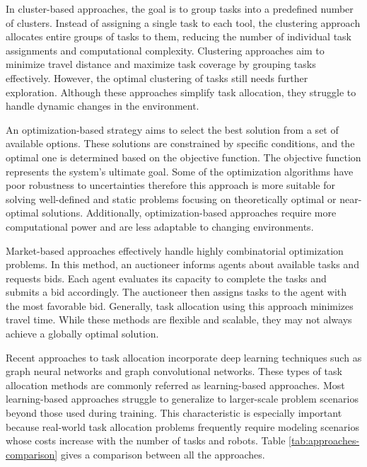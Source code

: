 In cluster-based approaches, the goal is to group tasks into a predefined number of clusters. Instead of assigning a single task to each tool, the clustering approach allocates entire groups of tasks to them, reducing the number of individual task assignments and computational complexity. Clustering approaches aim to minimize travel distance and maximize task coverage by grouping tasks effectively. However, the optimal clustering of tasks still needs further exploration. Although these approaches simplify task allocation, they struggle to handle dynamic changes in the environment.

An optimization-based strategy aims to select the best solution from a set of available options. These solutions are constrained by specific conditions, and the optimal one is determined based on the objective function. The objective function represents the system's ultimate goal. Some of the optimization algorithms have poor robustness to uncertainties therefore this approach is more suitable for solving well-defined and static problems focusing on theoretically optimal or near-optimal solutions. Additionally, optimization-based approaches require more computational power and are less adaptable to changing environments.

Market-based approaches effectively handle highly combinatorial optimization problems. In this method, an auctioneer informs agents about available tasks and requests bids. Each agent evaluates its capacity to complete the tasks and submits a bid accordingly. The auctioneer then assigns tasks to the agent with the most favorable bid. Generally, task allocation using this approach minimizes travel time. While these methods are flexible and scalable, they may not always achieve a globally optimal solution.

Recent approaches to task allocation incorporate deep learning techniques such as graph neural networks and graph convolutional networks. These types of task allocation methods are commonly referred as learning-based approaches. Most learning-based approaches struggle to generalize to larger-scale problem scenarios beyond those used during training. This characteristic is especially important because real-world task allocation problems frequently require modeling scenarios whose costs increase with the number of tasks and robots. Table \ref{tab:approaches-comparison} gives a comparison between all the approaches.


